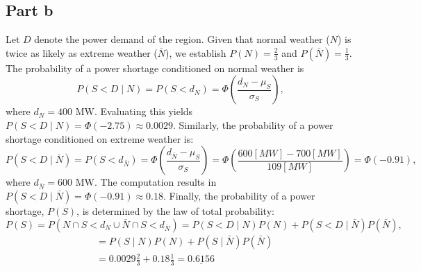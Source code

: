 \documentclass[12pt]{article}
\begin{document}
\subsection*{Part b}

Let \(D\) denote the power demand of the region. Given that normal weather (\(N\)) is twice as likely as extreme weather (\(\bar{N}\)), we establish \(P(N) = \frac{2}{3}\) and \(P(\bar{N}) = \frac{1}{3}\). The probability of a power shortage conditioned on normal weather is \[P(S < D \mid N) = P(S < d_N) = \Phi\left(\frac{d_N - \mu_S}{\sigma_S}\right),\] where \(d_N = 400\) MW. Evaluating this yields \(P(S < D \mid N) = \Phi(-2.75) \approx 0.0029\). Similarly, the probability of a power shortage conditioned on extreme weather is: \[P(S < D \mid \bar{N}) = P(S < d_{\bar{N}}) = \Phi\left(\frac{d_{\bar{N}} - \mu_S}{\sigma_S}\right)=\Phi\left(\frac{600[M W]-700[M W]}{109[M W]}\right) = \Phi(-0.91),\] where \(d_{\bar{N}} = 600\) MW. The computation results in \(P(S < D \mid \bar{N}) = \Phi(-0.91) \approx 0.18\). Finally, the probability of a power shortage, \(P(S)\), is determined by the law of total probability: \[P(S) = P(N \cap S < d_N \cup \bar{N} \cap S < d_{\bar{N}}) = P(S < D \mid N) P(N) + P(S < D \mid \bar{N}) P(\bar{N}),\] \[ \begin{aligned} & =P(S \mid N) P(N)+P(S \mid \bar{N}) P(\bar{N}) \\ & =0.0029 \frac{2}{3}+0.18 \frac{1}{3}=\underline{0.6156} \end{aligned} \]

\AnswerTag
\end{document}
